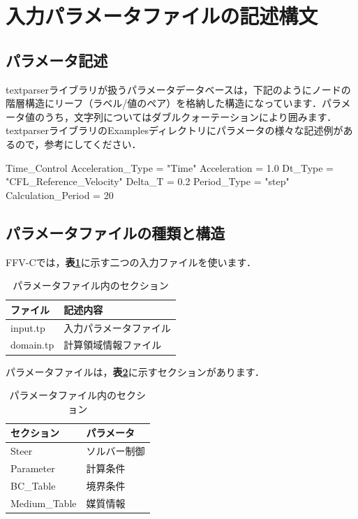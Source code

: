 \graphicspath{{./fig_Param/}}

%
\section{入力パラメータファイルの記述構文}
%
\subsection{パラメータ記述}
textparserライブラリが扱うパラメータデータベースは，下記のようにノードの階層構造にリーフ（ラベル/値のペア）を格納した構造になっています．パラメータ値のうち，文字列についてはダブルクォーテーションにより囲みます．
textparserライブラリのExamplesディレクトリにパラメータの様々な記述例があるので，参考にしてください．

{
\small 
\begin{program}
  Time_Control {
    Acceleration_Type  = "Time"
    Acceleration       = 1.0
    Dt_Type            = "CFL_Reference_Velocity"
    Delta_T            = 0.2
    Period_Type        = "step"
    Calculation_Period = 20
  }
\end{program}
}


%
\subsection{パラメータファイルの種類と構造}
FFV-Cでは，\textbf{表\ref{tbl:input_files}}に示す二つの入力ファイルを使います．

\begin{table}[htdp]
\caption{パラメータファイル内のセクション}
\begin{center}
\small
\begin{tabular}{ll} \toprule
ファイル & 記述内容\\ \midrule
input.tp & 入力パラメータファイル\\
domain.tp & 計算領域情報ファイル\\ \bottomrule
\end{tabular}
\end{center}
\label{tbl:input_files}
\end{table}


パラメータファイルは，\textbf{表\ref{tbl:param_tag}}に示すセクションがあります．


\begin{table}[htdp]
\caption{パラメータファイル内のセクション}
\begin{center}
\small
\begin{tabular}{ll} \toprule
セクション & パラメータ\\ \midrule
Steer & ソルバー制御\\
Parameter & 計算条件\\
BC\_Table & 境界条件\\
Medium\_Table & 媒質情報\\ \bottomrule
\end{tabular}
\end{center}
\label{tbl:param_tag}
\end{table}



